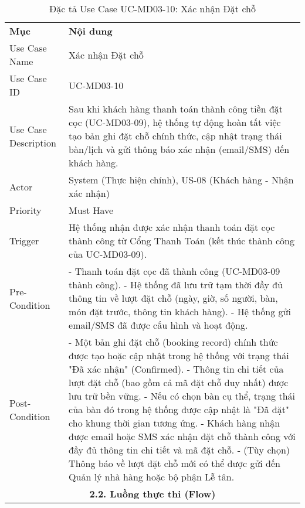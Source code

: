 \begin{longtable}{|m{4cm}|p{11cm}|}
\caption{Đặc tả Use Case UC-MD03-10: Xác nhận Đặt chỗ} \label{tab:uc_md03_10} \\
\hline

\endhead %
\hline
\endfoot %
\hline
\endlastfoot %
\multicolumn{2}{|c|}{\textbf{2.1. Tóm tắt (Summary)}} \\
\hline
\textbf{Mục} & \textbf{Nội dung} \\
\hline
Use Case Name & Xác nhận Đặt chỗ \\
\hline
Use Case ID & UC-MD03-10 \\
\hline
Use Case Description & Sau khi khách hàng thanh toán thành công tiền đặt cọc (UC-MD03-09), hệ thống tự động hoàn tất việc tạo bản ghi đặt chỗ chính thức, cập nhật trạng thái bàn/lịch và gửi thông báo xác nhận (email/SMS) đến khách hàng. \\
\hline
Actor & System (Thực hiện chính), US-08 (Khách hàng - Nhận xác nhận) \\
\hline
Priority & Must Have \\
\hline
Trigger & Hệ thống nhận được xác nhận thanh toán đặt cọc thành công từ Cổng Thanh Toán (kết thúc thành công của UC-MD03-09). \\
\hline
Pre-Condition & - Thanh toán đặt cọc đã thành công (UC-MD03-09 thành công). \newline - Hệ thống đã lưu trữ tạm thời đầy đủ thông tin về lượt đặt chỗ (ngày, giờ, số người, bàn, món đặt trước, thông tin khách hàng). \newline - Hệ thống gửi email/SMS đã được cấu hình và hoạt động. \\
\hline
Post-Condition & - Một bản ghi đặt chỗ (booking record) chính thức được tạo hoặc cập nhật trong hệ thống với trạng thái "Đã xác nhận" (Confirmed). \newline - Thông tin chi tiết của lượt đặt chỗ (bao gồm cả mã đặt chỗ duy nhất) được lưu trữ bền vững. \newline - Nếu có chọn bàn cụ thể, trạng thái của bàn đó trong hệ thống được cập nhật là "Đã đặt" cho khung thời gian tương ứng. \newline - Khách hàng nhận được email hoặc SMS xác nhận đặt chỗ thành công với đầy đủ thông tin chi tiết và mã đặt chỗ. \newline - (Tùy chọn) Thông báo về lượt đặt chỗ mới có thể được gửi đến Quản lý nhà hàng hoặc bộ phận Lễ tân. \\
\hline
\multicolumn{2}{|c|}{\textbf{2.2. Luồng thực thi (Flow)}} \\

\end{longtable}
